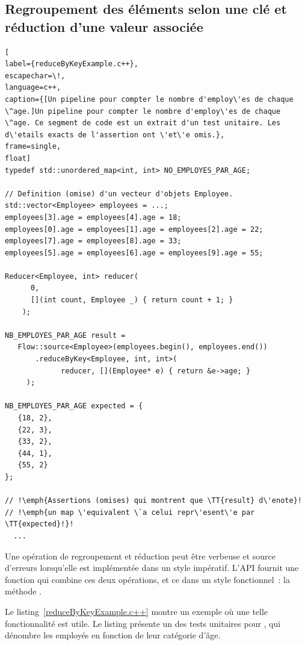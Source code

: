\subsection{Regroupement des \'el\'ements selon une cl\'e et r\'eduction d'une valeur associ\'ee}

\label{reduceByKey.sect}

\begin{lstlisting}[
label={reduceByKeyExample.c++},
escapechar=\!,
language=c++,
caption={[Un pipeline pour compter le nombre d'employ\'es de chaque \^age.]Un pipeline pour compter le nombre d'employ\'es de chaque \^age. Ce segment de code est un extrait d'un test unitaire. Les d\'etails exacts de l'assertion ont \'et\'e omis.},
frame=single,
float]
typedef std::unordered_map<int, int> NO_EMPLOYES_PAR_AGE;

// Definition (omise) d'un vecteur d'objets Employee.
std::vector<Employee> employees = ...; 
employees[3].age = employees[4].age = 18;
employees[0].age = employees[1].age = employees[2].age = 22;
employees[7].age = employees[8].age = 33;
employees[5].age = employees[6].age = employees[9].age = 55;

Reducer<Employee, int> reducer(
      0,
      [](int count, Employee _) { return count + 1; }
    );

NB_EMPLOYES_PAR_AGE result = 
   Flow::source<Employee>(employees.begin(), employees.end())
       .reduceByKey<Employee, int, int>(
             reducer, [](Employee* e) { return &e->age; }
     );
    
NB_EMPLOYES_PAR_AGE expected = {
   {18, 2},
   {22, 3},
   {33, 2},
   {44, 1},
   {55, 2}
};

// !\emph{Assertions (omises) qui montrent que \TT{result} d\'enote}!
// !\emph{un map \'equivalent \`a celui repr\'esent\'e par \TT{expected}!}!
  ...
\end{lstlisting}

Une op\'eration de regroupement et r\'eduction peut \^etre verbeuse et source d'erreurs lorsqu'elle est impl\'ement\'ee dans un style imp\'eratif. L'{API} fournit une fonction qui combine ces deux op\'erations, et ce  dans un style fonctionnel~: la m\'ethode .

Le listing~\ref{reduceByKeyExample.c++} montre un exemple o\`u une telle fonctionnalit\'e est utile. Le listing pr\'esente un des tests unitaires pour , qui d\'enombre les employ\'es en fonction de leur cat\'egorie d'\^age. 

